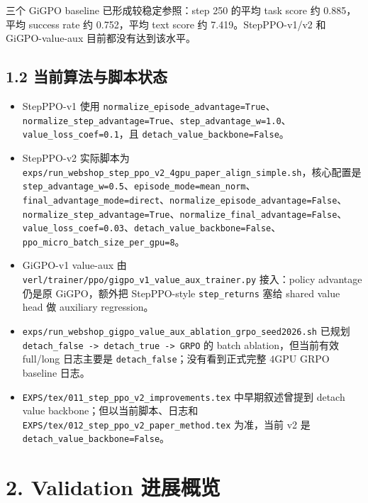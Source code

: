 \documentclass[10pt]{ctexart}
\begin{document}
三个 GiGPO baseline 已形成较稳定参照：step 250 的平均 task score 约 0.885，平均 success rate 约 0.752，平均 text score 约 7.419。StepPPO-v1/v2 和 GiGPO-value-aux 目前都没有达到该水平。

\subsection*{1.2 当前算法与脚本状态}

\begin{itemize}
\item StepPPO-v1 使用 \texttt{normalize\_episode\_advantage=True}、\texttt{normalize\_step\_advantage=True}、\texttt{step\_advantage\_w=1.0}、\texttt{value\_loss\_coef=0.1}，且 \texttt{detach\_value\_backbone=False}。
\item StepPPO-v2 实际脚本为 \texttt{exps/run\_webshop\_step\_ppo\_v2\_4gpu\_paper\_align\_simple.sh}，核心配置是 \texttt{step\_advantage\_w=0.5}、\texttt{episode\_mode=mean\_norm}、\texttt{final\_advantage\_mode=direct}、\texttt{normalize\_episode\_advantage=False}、\texttt{normalize\_step\_advantage=True}、\texttt{normalize\_final\_advantage=False}、\texttt{value\_loss\_coef=0.03}、\texttt{detach\_value\_backbone=False}、\texttt{ppo\_micro\_batch\_size\_per\_gpu=8}。
\item GiGPO-v1 value-aux 由 \texttt{verl/trainer/ppo/gigpo\_v1\_value\_aux\_trainer.py} 接入：policy advantage 仍是原 GiGPO，额外把 StepPPO-style \texttt{step\_returns} 塞给 shared value head 做 auxiliary regression。
\item \texttt{exps/run\_webshop\_gigpo\_value\_aux\_ablation\_grpo\_seed2026.sh} 已规划 \texttt{detach\_false -> detach\_true -> GRPO} 的 batch ablation，但当前有效 full/long 日志主要是 \texttt{detach\_false}；没有看到正式完整 4GPU GRPO baseline 日志。
\item \texttt{EXPS/tex/011\_step\_ppo\_v2\_improvements.tex} 中早期叙述曾提到 detach value backbone；但以当前脚本、日志和 \texttt{EXPS/tex/012\_step\_ppo\_v2\_paper\_method.tex} 为准，当前 v2 是 \texttt{detach\_value\_backbone=False}。
\end{itemize}

\section*{2. Validation 进展概览}
\end{document}

